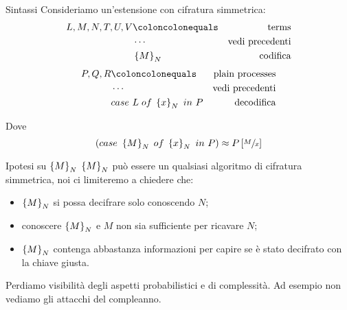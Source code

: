 \begin{frame}{Sintassi}
  Consideriamo un'estensione con cifratura simmetrica:
  \begin{align*}
    L,M,N,T,U,V & \coloncolonequals & \text{terms} \\
                & \cdots & \text{vedi precedenti} \\
                & \set{M}_N & \text{codifica}
  \end{align*}
  \begin{align*}
    P,Q,R & \coloncolonequals & \text{plain processes} \\
          & \cdots & \text{vedi precedenti} \\
          & case\ L\; of\; \set{x}_N\ in\ P & \text{decodifica}
  \end{align*}

  Dove
  \[ \left( case\ \left\{M\right\}_N\; of\; \left\{x\right\}_N\ in\ P\right) \approx
    P\left[\sfrac{M}{x}\right] \]
\end{frame}

\begin{frame}{Ipotesi su $\left\{M\right\}_N$}
  $\left\{M\right\}_N$ pu\`o essere un qualsiasi algoritmo di cifratura simmetrica,
  noi ci limiteremo a chiedere che:
  \begin{itemize}
  \item $\left\{M\right\}_N$ si possa decifrare solo conoscendo $N$;
  \item conoscere $\left\{M\right\}_N$ e $M$ non sia sufficiente per ricavare $N$;
  \item $\left\{M\right\}_N$ contenga abbastanza informazioni per capire se \`e stato
    decifrato con la chiave giusta.
  \end{itemize}
  \vfill
  \pause

  Perdiamo visibilit\`a degli aspetti probabilistici e di
  complessit\`a. Ad esempio non vediamo gli attacchi del compleanno.
\end{frame}

